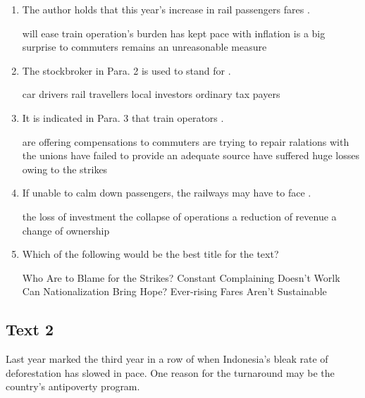 \begin{enumerate}[resume]
	\item
The author holds that this year's increase in rail passengers fares \lineread.


\fourchoices
{will ease train operation's burden}
{has kept pace with inflation}
{is a big surprise to commuters}
{remains an unreasonable measure}


\item
The stockbroker in Para. 2 is used to stand for \lineread.


\fourchoices
{car drivers}
{rail travellers}
{local investors}
{ordinary tax payers}


\item
 It is indicated in Para. 3 that train operators \lineread.


\fourchoices
{are offering compensations to commuters}
{are trying to repair ralations with the unions}
{have failed to provide an adequate source}
{have suffered huge losses owing to the strikes}


\item
If unable to calm down passengers, the railways may have to face \lineread.


\fourchoices
{the loss of investment}
{the collapse of operations}
{a reduction of revenue}
{a change of ownership}



\item
 Which of the following would be the best title for the text?


\fourchoices
{Who Are to Blame for the Strikes?}
{Constant Complaining Doesn't Worlk}
{Can Nationalization Bring Hope?}
{Ever-rising Fares Aren't Sustainable	}

	
\end{enumerate}





\newpage
\subsection{Text 2}



Last year marked the third year in a row of when Indonesia's bleak rate
of deforestation has slowed in pace. One reason for the turnaround may
be the country's antipoverty program.

